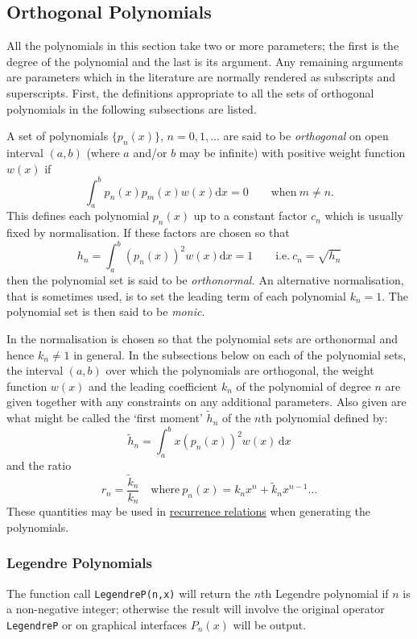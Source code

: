 \subsection{Orthogonal Polynomials}
\hypertarget{POLYFN}{}

All the polynomials in this section take two or more parameters; the first is
the degree of the polynomial and the last is its argument. Any remaining
arguments are parameters which in the literature are normally rendered as
subscripts and superscripts. First, the definitions appropriate to all the sets
of orthogonal polynomials in the following subsections are listed.

A set of polynomials $\{p_n(x)\},\, n=0,1,\ldots$
are said to be \emph{orthogonal} on open interval $(a, b)$
(where $a$ and/or $b$ may be infinite) with positive weight function $w(x)$ if
\[\int_a^b p_n(x)p_m(x)w(x) \mathrm{d}x = 0 \qquad \mbox{when}\ m \neq n.\]
This defines each polynomial $p_n(x)$ up to a constant factor $c_n$ which is
usually fixed by normalisation. If these factors are chosen so that
\[h_n=\int_a^b (p_n(x))^2 w(x) \mathrm{d}x = 1\qquad\mbox{i.e.}\
c_n=\sqrt{h_n}\]
then the polynomial set is said to be \emph{orthonormal.}
An alternative normalisation, that is sometimes used, is to set the leading term
of each polynomial $k_n = 1$. The polynomial set is then said to be
\emph{monic}.

In \REDUCE the normalisation is chosen so that the polynomial
sets are orthonormal and hence $k_n \neq 1$ in general. In the subsections below
on each of the polynomial sets, the interval $(a,b)$ over which the polynomials
are orthogonal, the weight function $w(x)$ and the leading coefficient $k_n$ of
the polynomial of degree $n$ are given together with any constraints on any
additional parameters. Also given are what might be called the `first moment'
$\tilde{h}_n$ of the $n$th polynomial defined by:
\[\tilde{h}_n = \int_a^b x  (p_n(x))^2 w(x) \,\mathrm{d}x\]
and the ratio
\[r_n = \frac{\tilde{k}_n}{k_n}\quad\mbox{where}\ p_n(x) =
k_n x^n + \tilde{k}_n x^{n-1} \ldots\]
These quantities may be used in \href{https://dlmf.nist.gov/18.2#iv}
{recurrence relations} when generating the polynomials.

\subsubsection{Legendre Polynomials}
\hypertarget{LEGENDREP}{}
The function call \texttt{LegendreP(n,x)} will return the $n$th Legendre
polynomial if $n$ is a non-negative integer; otherwise the result will involve
the original operator \texttt{LegendreP} or on graphical interfaces $P_n(x)$
will be output.

